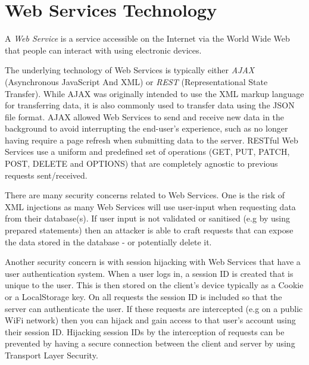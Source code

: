 \chapter{Web Services Technology}

A \textit{Web Service} is a service accessible on the Internet via the World Wide Web that people can interact with using electronic devices.

The underlying technology of Web Services is typically either \textit{AJAX} (Asynchronous JavaScript And XML) or \textit{REST} (Representational State Transfer). While AJAX was originally intended to use the XML markup language for transferring data, it is also commonly used to transfer data using the JSON file format. AJAX allowed Web Services to send and receive new data in the background to avoid interrupting the end-user's experience, such as no longer having require a page refresh when submitting data to the server. RESTful Web Services use a uniform and predefined set of operations (GET, PUT, PATCH, POST, DELETE and OPTIONS) that are completely agnostic to previous requests sent/received.

There are many security concerns related to Web Services. One is the risk of XML injections as many Web Services will use user-input when requesting data from their database(s). If user input is not validated or sanitised (e.g by using prepared statements) then an attacker is able to craft requests that can expose the data stored in the database - or potentially delete it.

Another security concern is with session hijacking with Web Services that have a user authentication system. When a user logs in, a session ID is created that is unique to the user. This is then stored on the client's device typically as a Cookie or a LocalStorage key. On all requests the session ID is included so that the server can authenticate the user. If these requests are intercepted (e.g on a public WiFi network) then you can hijack and gain access to that user's account using their session ID. Hijacking session IDs by the interception of requests can be prevented by having a secure connection between the client and server by using Transport Layer Security.
